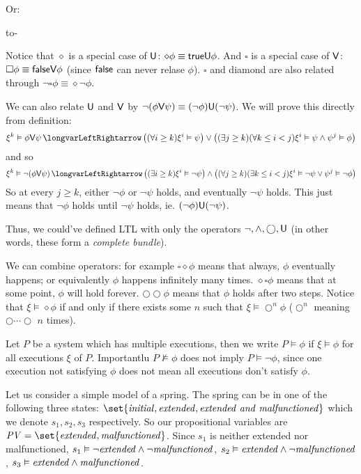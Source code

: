         \centerline{Or:}
        \medskip
        \moveright\leftskip\hbox to\dimexpr\hsize-\leftskip\relax{%
            \def\sqht{1cm}\leaders\tosq{$\psi$}\hskip\dimexpr\sqwd * 20\relax\tosq{$\stackmath{\psi\cr\noalign{\kern.2cm}\phi}$}\kern-\dimexpr\sqwd * 21\relax\leaders\sq\hfill\null}
\eenum

Notice that $\diamond$ is a special case of ${\sf U}$: $\diamond\phi\equiv{\sf true}{\sf U}\phi$.
And $\square$ is a special case of ${\sf V}$: $\square\phi\equiv{\sf false}{\sf V}\phi$ (since ${\sf false}$ can never relase $\phi$).
$\square$ and diamond are also related through $\neg\square\phi\equiv\diamond\neg\phi$.

We can also relate ${\sf U}$ and ${\sf V}$ by $\neg(\phi{\sf V}\psi)\equiv(\neg\phi){\sf U}(\neg\psi)$.
We will prove this directly from definition:
$$ \xi^k\vDash\phi\V\psi \iff \bigl((\forall i\geq k)\xi^i\vDash\psi\bigr)\lor\bigl((\exists j\geq k)(\forall k\leq i<j)\xi^i\vDash\psi\land\psi^j\vDash\phi\bigr) $$
and so
$$ \xi^k\vDash\neg(\phi\V\psi) \iff \bigl((\exists i\geq k)\xi^i\vDash\neg\psi\bigr)\land\bigl((\forall j\geq k)(\exists k\leq i<j)\xi^i\vDash\neg\psi\lor\psi^j\vDash\neg\phi\bigr) $$
So at every $j\geq k$, either $\neg\phi$ or $\neg\psi$ holds, and eventually $\neg\psi$ holds.
This just means that $\neg\phi$ holds until $\neg\psi$ holds, ie. $(\neg\phi){\sf U}(\neg\psi)$.

Thus, we could've defined LTL with only the operators $\neg,\land,\bigcirc,{\sf U}$ (in other words, these form a {\it complete bundle}).

We can combine operators: for example $\square\diamond\phi$ means that always, $\phi$ eventually happens; or equivalently $\phi$ happens infinitely many times.
$\diamond\square\phi$ means that at some point, $\phi$ will hold forever.
$\bigcirc\bigcirc\phi$ means that $\phi$ holds after two steps.
Notice that $\xi\vDash\diamond\phi$ if and only if there exists some $n$ such that $\xi\vDash\bigcirc^n\phi$ ($\bigcirc^n$ meaning $\bigcirc\cdots\bigcirc$ $n$ times).

Let $P$ be a system which has multiple executions, then we write $P\vDash\phi$ if $\xi\vDash\phi$ for all executions $\xi$ of $P$.
Importantlu $P\nvDash\phi$ does not imply $P\vDash\neg\phi$, since one execution not satisfying $\phi$ does not mean all executions don't satisfy $\phi$.

\bexam

    \def\mal{{\it malfunctioned}}\def\ext{{\it extended}}
    Let us consider a simple model of a spring.
    The spring can be in one of the following three states: $\set{{\it initial},{\it extended},{\it extended\ and\ malfunctioned}}$ which we denote $s_1,s_2,s_3$ respectively.
    So our propositional variables are $\PV=\set{\ext,\mal}$.
    Since $s_1$ is neither extended nor malfunctioned, $s_1\vDash\neg\ext\land\neg\mal$, $s_2\vDash\ext\land\neg\mal$, $s_3\vDash\ext\land\mal$.

